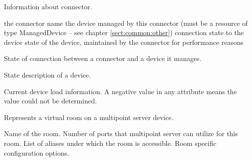\begin{Api}

Information about connector.
\begin{ApiClassAttributes}
 the connector name
 the device managed by this connector (must be a resource of type ManagedDevice -- see chapter \ref{sect:common:other})
 connection state to the device
 state of the device, maintained by the connector for performance reasons
\end{ApiClassAttributes}

State of connection between a connector and a device it manages.
\begin{ApiEnumValues}
\end{ApiEnumValues}

State description of a device.
\todo{}

Current device load information. A negative value in any attribute means the value could not be determined.
\begin{ApiClassAttributes}
\end{ApiClassAttributes}

Represents a virtual room on a multipoint server device.
\begin{ApiClassAttributes}
 Name of the room.
 Number of ports that multipoint server can utilize for this room.
 List of aliases under which the room is accessible.
 Room specific configuration options.
\end{ApiClassAttributes}


\end{Api}
